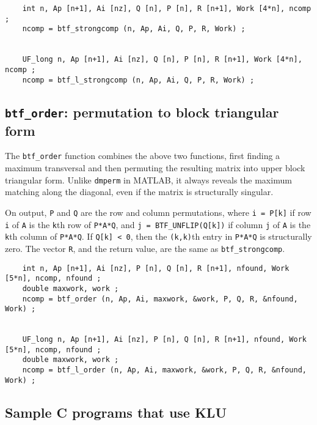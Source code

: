 \documentclass[11pt]{article}
\begin{document}
{\footnotesize
\begin{verbatim}
    int n, Ap [n+1], Ai [nz], Q [n], P [n], R [n+1], Work [4*n], ncomp ;
    ncomp = btf_strongcomp (n, Ap, Ai, Q, P, R, Work) ;


    UF_long n, Ap [n+1], Ai [nz], Q [n], P [n], R [n+1], Work [4*n], ncomp ;
    ncomp = btf_l_strongcomp (n, Ap, Ai, Q, P, R, Work) ;
\end{verbatim}
}

\subsection{{\tt btf\_order}: permutation to block triangular form}


The {\tt btf\_order} function combines the above two functions, first finding a
maximum transversal and then permuting the resulting matrix into upper block
triangular form.  Unlike {\tt dmperm} in MATLAB, it always reveals the maximum
matching along the diagonal, even if the matrix is structurally singular.

On output, {\tt P} and {\tt Q} are the row and column permutations, where
{\tt i = P[k]} if row {\tt i} of {\tt A} is the {\tt k}th row of {\tt P*A*Q},
and {\tt j = BTF\_UNFLIP(Q[k])} if column {\tt j} of {\tt A} is the {\tt k}th
column of {\tt P*A*Q}.  If {\tt Q[k] < 0}, then the {\tt (k,k)}th entry in
{\tt P*A*Q} is structurally zero.  The vector {\tt R}, and the return value,
are the same as {\tt btf\_strongcomp}.

{\footnotesize
\begin{verbatim}
    int n, Ap [n+1], Ai [nz], P [n], Q [n], R [n+1], nfound, Work [5*n], ncomp, nfound ;
    double maxwork, work ;
    ncomp = btf_order (n, Ap, Ai, maxwork, &work, P, Q, R, &nfound, Work) ;


    UF_long n, Ap [n+1], Ai [nz], P [n], Q [n], R [n+1], nfound, Work [5*n], ncomp, nfound ;
    double maxwork, work ;
    ncomp = btf_l_order (n, Ap, Ai, maxwork, &work, P, Q, R, &nfound, Work) ;
\end{verbatim}
}

\subsection{Sample C programs that use KLU}
\end{document}
